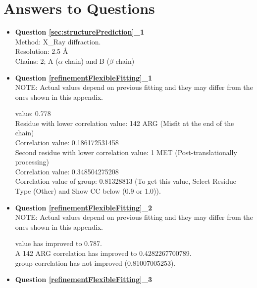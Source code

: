 \section{Answers to Questions}
\label{app:solutions}

\begin{itemize}
 \item \textbf{Question \ref{sec:structurePrediction}\_1}\\
 
Method: X\_Ray diffraction.\\
Resolution: 2.5 \AA\\
Chains: 2; A ($\alpha$ chain) and B ($\beta$ chain)\\

 \item \textbf{Question \ref{refinementFlexibleFitting}\_1}\\
 
 NOTE: Actual values depend on previous fitting and they may differ from the ones shown in this appendix.
 
\ccmask value: 0.778\\
Residue with lower correlation value: 142 ARG (Misfit at the end of the chain)\\
Correlation value: 0.186172531458\\
Second residue with lower correlation value: 1 MET (Post-translationally processing)\\
Correlation value: 0.348504275208\\
Correlation value of  group: 0.81328813 (To get this value, Select Residue Type (Other) and Show CC below (0.9 or 1.0)).\\

 \item \textbf{Question \ref{refinementFlexibleFitting}\_2}\\
 
 NOTE: Actual values depend on previous fitting and they may differ from the ones shown in this appendix.

 \ccmask value has improved to 0.787.\\
A 142 ARG correlation has improved to 0.4282267700789.\\
 group correlation has not improved (0.81007005253).\\

 \item \textbf{Question \ref{refinementFlexibleFitting}\_3}\\
 

\end{itemize}
